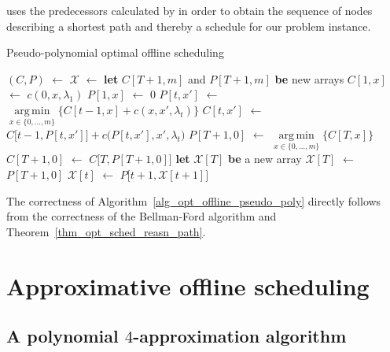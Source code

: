 \documentclass[hidelinks]{article}
\newcommand\Let[2]{\State #1 $\gets$ #2}
\newcommand\Blet[2]{\State \textbf{let} #1 \textbf{be} #2}
\theoremstyle{plain}
\theoremstyle{definition}
\theoremstyle{rem}
\DeclareMathOperator*{\argmin}{arg\,min}
\newcommand{\mx}{\mathcal{X}}
\newcommand{\costs}{c}
\newcommand{\fromto}[2]{\{#1,\ldots,#2\}}
\begin{document}
 uses the predecessors calculated by  in order to obtain the sequence of nodes describing a shortest path and thereby a schedule for our problem instance.
\begin{algorithm}[H]
  \caption{Pseudo-polynomial optimal offline scheduling}
  \begin{algorithmic}[1]
	  \Let{$(C,P)$}{}
	  \Let{$\mx$}{\Call{extract\_schedule}{$P,T$}}
	  \State \Return{$\mx$}
  \EndFunction
  \Statex
	\Blet{$C[T+1,m]$ and $P[T+1,m]$}{new arrays}
		\Let{$C[1,x]$}{$\costs(0,x,\lambda_1)$}
		\Let{$P[1,x]$}{$0$}
	\EndFor
			\Let{$P[t,x']$}{$\argmin\limits_{x\in\fromto{0}{m}}\bigl\{C[t-1,x]+\costs(x,x',\lambda_t)\bigr\}$}
			\Let{$C[t,x']$}{$C\bigl[t-1,P[t,x']\bigr]+c\bigl(P[t,x'],x',\lambda_t\bigr)$}
		\EndFor
	\EndFor
	\Let{$P[T+1,0]$}{$\argmin\limits_{x\in\fromto{0}{m}}\bigl\{C[T,x]\bigr\}$}
	\Let{$C[T+1,0]$}{$C\bigl[T,P[T+1,0]\bigr]$}
	\State {}
  \EndFunction
  \Statex
	\Blet{$\mx[T]$}{a new array}
    	\Let{$\mx[T]$}{$P[T+1,0]$}
		\Let{$\mx[t]$}{$P\bigl[t+1,\mx[t+1]\bigr]$}
	\EndFor
	\State \Return{$\mx$}
  \EndFunction

  \end{algorithmic}
\label{alg_opt_offline_pseudo_poly}
\end{algorithm}
The correctness of Algorithm~\ref{alg_opt_offline_pseudo_poly} directly follows from the correctness of the Bellman-Ford algorithm and Theorem~\ref{thm_opt_sched_reasn_path}.

\section{Approximative offline scheduling}
\subsection{A polynomial $4$-approximation algorithm}
\end{document}
